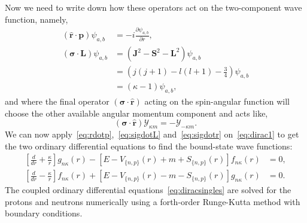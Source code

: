 Now we need to write down how these operators act on the two-component wave function, namely,
\begin{align}
(\mathbf{\hat{r}\cdot p})\psi _{a,b} &= -i\frac{\partial \psi _{a,b}}{\partial r},\label{eq:rdotp}
\\[2ex]
(\boldsymbol{\sigma}\cdot\mathbf{L})\psi _{a,b} &= (\mathbf{J}^2-\mathbf{S}^2-\mathbf{L}^2)\psi _{a,b} \nonumber \\
&= \left( j(j+1)-l(l+1)-\frac{3}{4} \right) \psi _{a,b} \nonumber \\
&= (\kappa - 1)\psi _{a,b}, \label{eq:sigdotL}
\end{align}
and where the final operator $(\boldsymbol{\sigma}\cdot\mathbf{\hat{r}})$ acting on the spin-angular function will choose the other available angular momentum component and acts like,
\begin{equation}\label{eq:sigdotr}
(\boldsymbol{\sigma}\cdot\mathbf{\hat{r}})\mathcal{Y}_{\kappa m}=-\mathcal{Y}_{-\kappa m}.
\end{equation}
We can now apply~\eqref{eq:rdotp},~\eqref{eq:sigdotL} and~\eqref{eq:sigdotr} on~\eqref{eq:dirac1} to get the two ordinary differential equations to find the bound-state wave functions:
\begin{equation}\label{eq:diracsingles}
\begin{aligned}
\left[ \frac{d}{dr}+\frac{\kappa}{r}\right] g_{n\kappa}(r) - \left[ E-V_{\lbrace n,p\rbrace}(r)+m+S_{\lbrace n,p\rbrace}(r)\right] f_{n\kappa}(r) &= 0,
\\
\left[ \frac{d}{dr}-\frac{\kappa}{r}\right] f_{n\kappa}(r) +\left[ E-V_{\lbrace n,p\rbrace}(r)-m-S_{\lbrace n,p\rbrace}(r)\right] g_{n\kappa}(r) &= 0.
\end{aligned} 
\end{equation}
The coupled ordinary differential equations~\eqref{eq:diracsingles} are solved for the protons and neutrons numerically using a forth-order Runge-Kutta method with boundary conditions.


%
